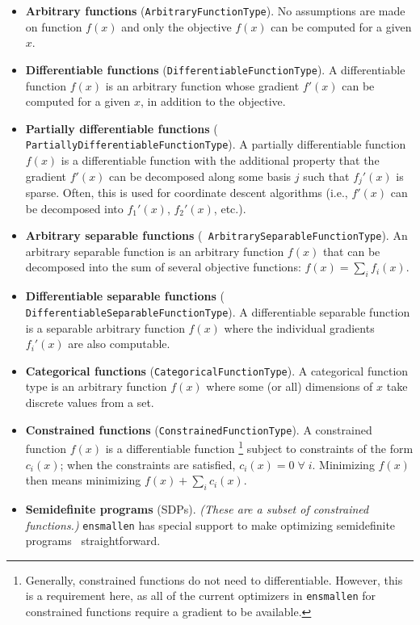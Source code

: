 \begin{itemize}
\item {\bf Arbitrary functions} ({\tt ArbitraryFunctionType}).
No assumptions are made on function $f(x)$ and only the objective
$f(x)$ can be computed for a given $x$.

\item {\bf Differentiable functions} ({\tt DifferentiableFunctionType}).
A differentiable function $f(x)$ is an arbitrary function whose gradient $f'(x)$
can be computed for a given $x$, in addition to the objective.

\item {\bf Partially differentiable functions} ({\tt
PartiallyDifferentiableFunctionType}).  A partially differentiable function
$f(x)$ is a differentiable function with the additional property that the
gradient $f'(x)$ can be decomposed along some basis $j$ such that $f_j'(x)$ is
sparse.  Often, this is used for coordinate descent algorithms (i.e., $f'(x)$
can be decomposed into $f_{1}'(x)$, $f_{2}'(x)$, etc.).

\item {\bf Arbitrary separable functions} ({\tt
ArbitrarySeparableFunctionType}).  An arbitrary separable function is an
arbitrary function $f(x)$ that can be decomposed into the sum of several
objective functions: $f(x) = \sum\nolimits_i f_i(x)$.

\item {\bf Differentiable separable functions} ({\tt
DifferentiableSeparableFunctionType}).  A differentiable separable function is a
separable arbitrary function $f(x)$ where the individual gradients $f_i'(x)$ are
also computable.

\item {\bf Categorical functions} ({\tt CategoricalFunctionType}).  A
categorical function type is an arbitrary function $f(x)$ where some (or all)
dimensions of $x$ take discrete values from a set.

\item {\bf Constrained functions} ({\tt ConstrainedFunctionType}).
A constrained function $f(x)$ is a differentiable function%
\footnote{Generally, constrained functions  do not need to differentiable.
However, this is a requirement here, as all of the current optimizers in {\tt ensmallen}
for constrained functions require a gradient to be available.}
subject to constraints of the form $c_i(x)$; when the constraints are satisfied, $c_i(x) = 0\; \forall \; i$.
Minimizing $f(x)$ then means minimizing $f(x) + \sum_i c_i(x)$.

\item {\bf Semidefinite programs} (SDPs).  {\it (These are a subset of
constrained functions.)}  {\tt ensmallen} has special
support to make optimizing semidefinite
programs~\cite{vandenberghe1996semidefinite} straightforward.
\end{itemize}


